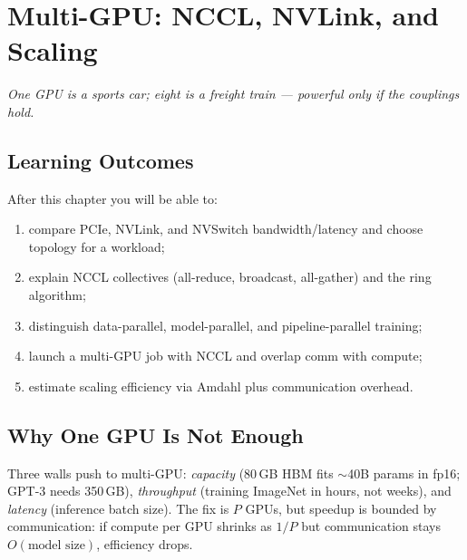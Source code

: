 \chapter{Multi-GPU: NCCL, NVLink, and Scaling}\label{ch:multi}
\sloppy

\begin{center}\small\textit{One GPU is a sports car; eight is a freight train --- powerful only if the couplings hold.}\end{center}

\noindent{}
\vspace{0.4em}

\section*{Learning Outcomes}
After this chapter you will be able to:
\begin{enumerate}[label=(L\arabic*)]
    \item compare PCIe, NVLink, and NVSwitch bandwidth/latency and choose topology for a workload;
    \item explain NCCL collectives (all-reduce, broadcast, all-gather) and the ring algorithm;
    \item distinguish data-parallel, model-parallel, and pipeline-parallel training;
    \item launch a multi-GPU job with NCCL and overlap comm with compute;
    \item estimate scaling efficiency via Amdahl plus communication overhead.
\end{enumerate}

\section{Why One GPU Is Not Enough}
Three walls push to multi-GPU: \emph{capacity} (80\,GB HBM fits $\sim$40B params in fp16; GPT-3 needs 350\,GB), \emph{throughput} (training ImageNet in hours, not weeks), and \emph{latency} (inference batch size). The fix is $P$ GPUs, but speedup is bounded by communication: if compute per GPU shrinks as $1/P$ but communication stays $O(\text{model size})$, efficiency drops.

